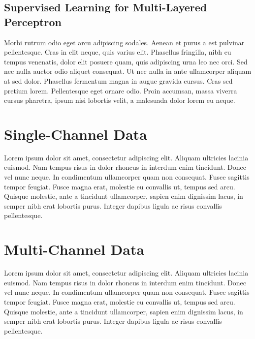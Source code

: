 
\subsection{Supervised Learning for Multi-Layered Perceptron}
Morbi rutrum odio eget arcu adipiscing sodales. Aenean et purus a est pulvinar pellentesque. Cras in elit neque, quis varius elit. Phasellus fringilla, nibh eu tempus venenatis, dolor elit posuere quam, quis adipiscing urna leo nec orci. Sed nec nulla auctor odio aliquet consequat. Ut nec nulla in ante ullamcorper aliquam at sed dolor. Phasellus fermentum magna in augue gravida cursus. Cras sed pretium lorem. Pellentesque eget ornare odio. Proin accumsan, massa viverra cursus pharetra, ipsum nisi lobortis velit, a malesuada dolor lorem eu neque.


\section{Single-Channel Data}

Lorem ipsum dolor sit amet, consectetur adipiscing elit. Aliquam ultricies lacinia euismod. Nam tempus risus in dolor rhoncus in interdum enim tincidunt. Donec vel nunc neque. In condimentum ullamcorper quam non consequat. Fusce sagittis tempor feugiat. Fusce magna erat, molestie eu convallis ut, tempus sed arcu. Quisque molestie, ante a tincidunt ullamcorper, sapien enim dignissim lacus, in semper nibh erat lobortis purus. Integer dapibus ligula ac risus convallis pellentesque.


\section{Multi-Channel Data}

Lorem ipsum dolor sit amet, consectetur adipiscing elit. Aliquam ultricies lacinia euismod. Nam tempus risus in dolor rhoncus in interdum enim tincidunt. Donec vel nunc neque. In condimentum ullamcorper quam non consequat. Fusce sagittis tempor feugiat. Fusce magna erat, molestie eu convallis ut, tempus sed arcu. Quisque molestie, ante a tincidunt ullamcorper, sapien enim dignissim lacus, in semper nibh erat lobortis purus. Integer dapibus ligula ac risus convallis pellentesque.